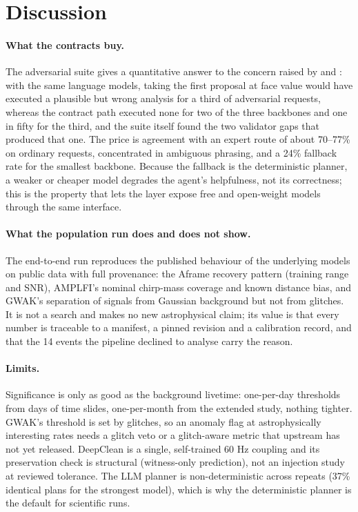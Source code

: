 \documentclass[twocolumn]{aastex631}
\begin{document}
\section{Discussion}
\label{sec:discussion}

\paragraph{What the contracts buy.} The adversarial suite gives a
quantitative answer to the concern raised by \citet{rawat2026} and
\citet{islam2026}: with the same language models, taking the first
proposal at face value would have executed a plausible but wrong analysis
for a third of adversarial requests, whereas the contract path executed
none for two of the three backbones and one in fifty for the third, and
the suite itself found the two validator gaps that produced that one. The
price is agreement with an expert route of about 70--77\% on ordinary
requests, concentrated in ambiguous phrasing, and a 24\% fallback rate for
the smallest backbone. Because the fallback is the deterministic planner,
a weaker or cheaper model degrades the agent's helpfulness, not its
correctness; this is the property that lets the layer expose free and
open-weight models through the same interface.

\paragraph{What the population run does and does not show.} The
end-to-end run reproduces the published behaviour of the underlying
models on public data with full provenance: the Aframe recovery pattern
(training range and SNR), AMPLFI's nominal chirp-mass coverage and known
distance bias, and GWAK's separation of signals from Gaussian background
but not from glitches. It is not a search and makes no new astrophysical
claim; its value is that every number is traceable to a manifest, a pinned
revision and a calibration record, and that the 14 events the pipeline
declined to analyse carry the reason.

\paragraph{Limits.} Significance is only as good as the background
livetime: one-per-day thresholds from days of time slides, one-per-month
from the extended study, nothing tighter. GWAK's threshold is set by
glitches, so an anomaly flag at astrophysically interesting rates needs a
glitch veto or a glitch-aware metric that upstream has not yet released.
DeepClean is a single, self-trained 60 Hz coupling and its preservation
check is structural (witness-only prediction), not an injection study at
reviewed tolerance. The LLM planner is non-deterministic across repeats
(37\% identical plans for the strongest model), which is why the
deterministic planner is the default for scientific runs.
\end{document}
